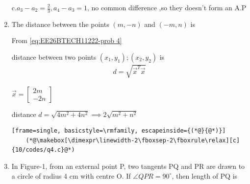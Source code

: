 \begin{enumerate}[label=\thesubsection.\arabic*, ref=\thesubsection.\theenumi]
	c.$a_3-a_2=\frac{2}{3},a_4-a_3=1$, no common difference ,so they doesn't form an A.P
	\newpage

	
	\item The distance between the points $(m, -n)$ and $(-m, n)$ is
	\begin{enumerate}
	\end{enumerate}
	\solution 
	
	From \eqref{eq:EE26BTECH11222-prob 4}
	
	distance between two points $(x_1,y_1); (x_2,y_2)$ is 
	\begin{align}
		d=\sqrt{\vec{x}^T\vec{x}}
	\end{align}
	
	$\vec{x}=\begin{bmatrix}
		2m \\ -2n \end{bmatrix}$
		
	distance $d = \sqrt{4m^2+4n^2}\implies 2\sqrt{m^2+n^2}$
	
\begin{lstlisting}[frame=single, basicstyle=\rmfamily, escapeinside={(*@}{@*)}]
	(*@\makebox[\dimexpr\linewidth-2\fboxsep-2\fboxrule\relax][c]{10/codes/q4.c}@*)
\end{lstlisting}
	
	\item In Figure-1, from an external point P, two tangents PQ and PR are drawn to a circle of radius 4 cm with centre O. If $\angle QPR = 90^{\circ}$, then length of PQ is 
	\begin{enumerate}
		\begin{multicols}{4}
			
			\item 3 cm
			
			\item 4 cm
			
			\item 2 cm
			
			\item $2\sqrt{2}\text{cm}$
		\end{multicols}
	\end{enumerate}
	

\end{enumerate}
